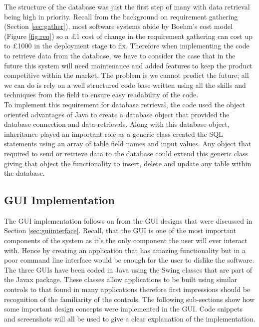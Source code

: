 \documentclass[12pt,a4paper]{article}
\begin{document}
The structure of the database was just the first step of many with data retrieval being high in
priority. Recall from the background on requirement gathering (Section \ref{sec:gather}), most software systems
abide by Boehm’s cost model (Figure \ref{fig:req}) so a £1 cost of change in the requirement gathering can cost
up to £1000 in the deployment stage to fix. Therefore when implementing the code to retrieve data
from the database, we have to consider the case that in the future this system will need maintenance
and added features to keep the product competitive within the market. The problem is we cannot
predict the future; all we can do is rely on a well structured code base written using all the skills and
techniques from the field to ensure easy readability of the code.
\\To implement this requirement for database retrieval, the code used the object oriented advantages
of Java to create a database object that provided the database connection and data retrievals. Along
with this database object, inheritance played an important role as a generic class created the SQL
statements using an array of table field names and input values. Any object that required to send or retrieve data to the database could extend this generic class giving that object the functionality to
insert, delete and update any table within the database.

\subsection{GUI Implementation}
The GUI implementation follows on from the GUI designs that were discussed in Section \ref{sec:guiinterface}. Recall,
that the GUI is one of the most important components of the system as it’s the only component the
user will ever interact with. Hence by creating an application that has amazing functionality but in a
poor command line interface would be enough for the user to dislike the software.
The three GUIs have been coded in Java using the Swing classes that are part of the Javax package.
These classes allow applications to be built using similar controls to that found in many applications
therefore first impressions should be recognition of the familiarity of the controls.
The following sub-sections show how some important design concepts were implemented in the
GUI. Code snippets and screenshots will all be used to give a clear explanation of the
implementation.
\end{document}
